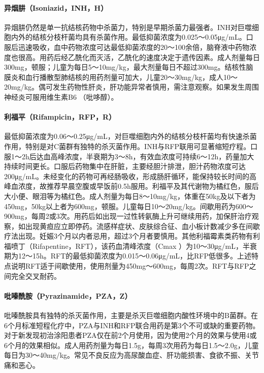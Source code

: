 \paragraph{异烟肼（Isoniazid，INH，H）}

异烟肼仍然是单一抗结核药物中杀菌力，特别是早期杀菌力最强者。INH对巨噬细胞内外的结核分枝杆菌均具有杀菌作用。最低抑菌浓度为0.025～0.05μg/mL。口服后迅速吸收，血中药物浓度可达最低抑菌浓度的20～100余倍，脑脊液中药物浓度也很高。用药后经乙酰化而灭活，乙酰化的速度决定于遗传因素。成人剂量每日300mg，顿服；儿童为每日5～10mg/kg，最大剂量每日不超过300mg。结核性脑膜炎和血行播散型肺结核的用药剂量可加大，儿童20～30mg/kg，成人10～20mg/kg。偶可发生药物性肝炎，肝功能异常者慎用，需注意观察。如果发生周围神经炎可服用维生素B{6}
（吡哆醇）。
\paragraph{利福平（Rifampicin，RFP，R）}

最低抑菌浓度为0.06～0.25μg/mL，对巨噬细胞内外的结核分枝杆菌均有快速杀菌作用，特别是对C菌群有独特的杀灭菌作用。INH与RFP联用可显著缩短疗程。口服1～2h后达血高峰浓度，半衰期为3～8h，有效血浓度可持续6～12h，药量加大持续时间更长。口服后药物集中在肝脏，主要经胆汁排泄，胆汁药物浓度可达200μg/mL。未经变化的药物可再经肠吸收，形成肠肝循环，能保持较长时间的高峰血浓度，故推荐早晨空腹或早饭前0.5h服用。利福平及其代谢物为橘红色，服后大小便、眼泪等为橘红色。成人剂量为每日8～10mg/kg，体重在50kg及以下者为450mg，50kg以上者为600mg，顿服。儿童每日10～20mg/kg。间歇用药为600～900mg，每周2或3次。用药后如出现一过性转氨酶上升可继续用药，加保肝治疗观察，如出现黄疸应立即停药。流感样症状、皮肤综合征、血小板计数减少多在间歇疗法出现。妊娠3个月以内者忌用，超过3个月者要慎用。其他利福霉素类药物有利福喷丁（Rifapentine，RFT），该药血清峰浓度（C{max}
）为10～30μg/mL，半衰期为12～15h。RFT的最低抑菌浓度为0.015～0.06μg/mL，比RFP低很多。上述特点说明RFT适于间歇使用，使用剂量为450mg～600mg，每周2次。RFT与RFP之间完全交叉耐药。
\paragraph{吡嗪酰胺（Pyrazinamide，PZA，Z）}

吡嗪酰胺具有独特的杀灭菌作用，主要是杀灭巨噬细胞内酸性环境中的B菌群。在6个月标准短程化疗中，PZA与INH和RFP联合用药是第3个不可或缺的重要药物。对于新发现初治涂阳患者PZA仅在前2个月使用，因为使用2个月的效果与使用4或6个月的效果相似。成人用药剂量为每日1.5g，每周3次用药为每日1.5～2.0g，儿童每日为30～40mg/kg。常见不良反应为高尿酸血症、肝功能损害、食欲不振、关节痛和恶心。
